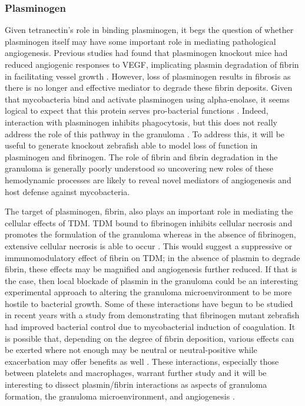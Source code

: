 \subsubsection{Plasminogen}

Given tetranectin's role in binding plasminogen, it begs the question of whether plasminogen itself may have some important role in mediating pathological angiogenesis. Previous studies had found that plasminogen knockout mice had reduced angiogenic responses to VEGF, implicating plasmin degradation of fibrin in facilitating vessel growth \citep{Oh2003}. However, loss of plasminogen results in fibrosis as there is no longer and effective mediator to degrade these fibrin deposits. Given that mycobacteria bind and activate plasminogen using alpha-enolase, it seems logical to expect that this protein serves pro-bacterial functions \citep{Monroy2000}. Indeed, interaction with plasminogen inhibits phagocytosis, but this does not really address the role of this pathway in the granuloma \citep{EcheverriaValencia2019}. To address this, it will be useful to generate knockout zebrafish able to model loss of function in plasminogen and fibrinogen. The role of fibrin and fibrin degradation in the granuloma is generally poorly understood so uncovering new roles of these hemodynamic processes are likely to reveal novel mediators of angiogenesis and host defense against mycobacteria.

The target of plasminogen, fibrin, also plays an important role in mediating the cellular effects of TDM. TDM bound to fibrinogen inhibits cellular necrosis and promotes the formulation of the granuloma whereas in the absence of fibrinogen, extensive cellular necrosis is able to occur \citep{Sakamoto2010}. This would suggest a suppressive or immunomodulatory effect of fibrin on TDM; in the absence of plasmin to degrade fibrin, these effects may be magnified and angiogenesis further reduced. If that is the case, then local blockade of plasmin in the granuloma could be an interesting experimental approach to altering the granuloma microenvironment to be more hostile to bacterial growth. Some of these interactions have begun to be studied in recent years with a study from \citet{Hortle2019} demonstrating that fibrinogen mutant zebrafish had improved bacterial control due to mycobacterial induction of coagulation. It is possible that, depending on the degree of fibrin deposition, various effects can be exerted where not enough may be neutral or neutral-positive while exacerbation may offer benefits as well \citep{Venkatasubramanian2016}. These interactions, especially those between platelets and macrophages, warrant further study and it will be interesting to dissect plasmin/fibrin interactions as aspects of granuloma formation, the granuloma microenvironment, and angiogenesis \citep{Feng2014, LugoVillarino2014}.

